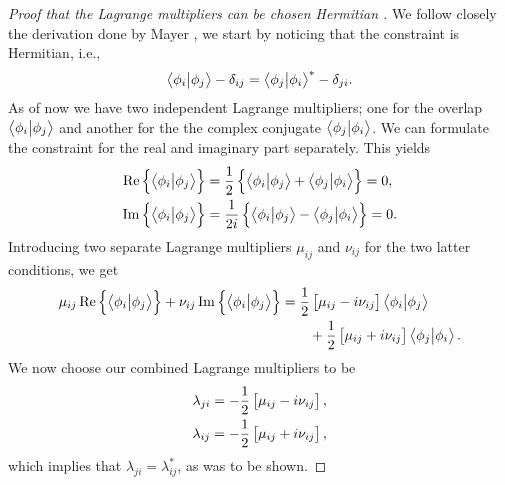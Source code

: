             \begin{proof}[%
                    Proof that the Lagrange multipliers can be chosen Hermitian%
                ]
                We follow closely the derivation done by Mayer
                \cite{mayer2003simple}, we start by noticing that the constraint is
                Hermitian, i.e.,
                \begin{align}
                    \braket{\phi_i}{\phi_j} - \delta_{ij}
                    = \braket{\phi_j}{\phi_i}^{*} - \delta_{ji}.
                \end{align}
                As of now we have two independent Lagrange multipliers; one for the
                overlap $\braket{\phi_i}{\phi_j}$ and another for the the complex
                conjugate $\braket{\phi_j}{\phi_i}$.
                We can formulate the constraint for the real and imaginary part
                separately.
                This yields
                \begin{align}
                    \Re\left\{ 
                        \braket{\phi_i}{\phi_j}
                     \right\}
                    &=
                    \frac{1}{2}\left\{ 
                        \braket{\phi_i}{\phi_j}
                        + \braket{\phi_j}{\phi_i}
                     \right\}
                    = 0,
                    \\
                    \Im\left\{ 
                        \braket{\phi_i}{\phi_j}
                     \right\}
                    &=
                    \frac{1}{2i}\left\{ 
                        \braket{\phi_i}{\phi_j}
                        - \braket{\phi_j}{\phi_i}
                     \right\}
                    = 0.
                \end{align}
                Introducing two separate Lagrange multipliers $\mu_{ij}$ and
                $\nu_{ij}$ for the two latter conditions, we get
                \begin{align}
                    \mu_{ij}\Re\left\{ 
                        \braket{\phi_i}{\phi_j}
                     \right\}
                    + \nu_{ij}\Im\left\{ 
                        \braket{\phi_i}{\phi_j}
                     \right\}
                    &=
                    \frac{1}{2}\left[ 
                        \mu_{ij} - i\nu_{ij}
                     \right]
                    \braket{\phi_i}{\phi_j}
                    \nonumber
                    \\
                    &\qquad
                    + \frac{1}{2}\left[ 
                        \mu_{ij} + i\nu_{ij}
                     \right]
                    \braket{\phi_j}{\phi_i}.
                \end{align}
                We now choose our combined Lagrange multipliers to be
                \begin{align}
                    \lambda_{ji} &=
                    -\frac{1}{2}\left[ 
                        \mu_{ij} - i\nu_{ij}
                     \right], \\
                    \lambda_{ij} &=
                    -\frac{1}{2}\left[ 
                        \mu_{ij} + i\nu_{ij}
                     \right],
                \end{align}
                which implies that $\lambda_{ji} = \lambda_{ij}^{*}$, as was to be
                shown.
            \end{proof}
